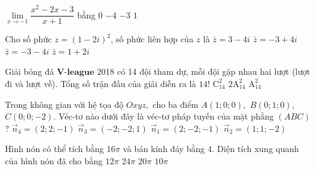 \begin{ex}%
	$\lim\limits_{x \rightarrow -1}{\dfrac{x^2-2x-3}{x+1}}$ bằng
	\choice
	{$0$}
	{\True $-4$}
	{$-3$}
	{$1$}
\end{ex}

\begin{ex}%
	Cho số phức $z=(1-2i)^2$, số phức liên hợp của $z$ là
	\choice
	{$\bar{z}=3-4i$}
	{\True $\bar{z}=-3+4i$}
	{$\bar{z}=-3-4i$}
	{$\bar{z}=1+2i$}
\end{ex}

\begin{ex}%
	Giải bóng đá $\textbf{V-league}$ 2018 có 14 đội tham dự, mỗi đội gặp nhau hai lượt (lượt đi và lượt về). Tổng số trận đấu của giải diễn ra là
	\choice
	{$14!$}
	{$\mathrm{C}_{14}^2$}
	{$2\mathrm{A}_{14}^2$}
	{\True $\mathrm{A}_{14}^2$}
\end{ex}

\begin{ex}%
Trong không gian với hệ tọa độ $Oxyz,$ cho ba điểm $A(1;0;0),$ $B(0;1;0),$ $C(0;0;-2).$ Véc-tơ nào dưới đây là véc-tơ pháp tuyến của mặt phẳng $(ABC)$?
\choice
{\True $\overrightarrow{n}_4=(2;2;-1)$}
{$\overrightarrow{n}_3=(-2;-2;1)$}
{$\overrightarrow{n}_1=(2;-2;-1)$}
{$\overrightarrow{n}_2=(1;1;-2)$}
\end{ex}

\begin{ex}%
	Hình nón có thể tích bằng $16\pi$ và bán kính đáy bằng $4$. Diện tích xung quanh của hình nón đã cho bằng
	\choice
	{$12\pi$}
	{$24\pi$}
	{\True $20\pi$}
	{$10\pi$}
\end{ex}

